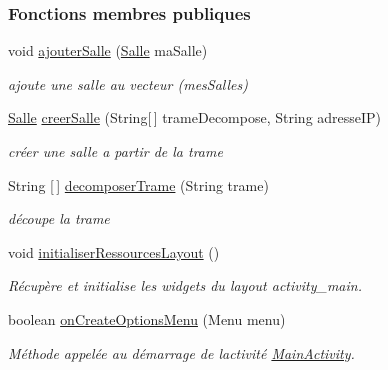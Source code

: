 \subsubsection*{Fonctions membres publiques}
\begin{DoxyCompactItemize}
\item 
void \hyperlink{classcom_1_1lasalle_1_1meeting_1_1_main_activity_a8fded0b03a19faea1b0e735af1aa52ca}{ajouter\+Salle} (\hyperlink{classcom_1_1lasalle_1_1meeting_1_1_salle}{Salle} ma\+Salle)
\begin{DoxyCompactList}\small\item\em ajoute une salle au vecteur (mes\+Salles) \end{DoxyCompactList}\item 
\hyperlink{classcom_1_1lasalle_1_1meeting_1_1_salle}{Salle} \hyperlink{classcom_1_1lasalle_1_1meeting_1_1_main_activity_a882bcd3e88633b5190d60625bb70dd43}{creer\+Salle} (String\mbox{[}$\,$\mbox{]} trame\+Decompose, String adresse\+IP)
\begin{DoxyCompactList}\small\item\em créer une salle a partir de la trame \end{DoxyCompactList}\item 
String \mbox{[}$\,$\mbox{]} \hyperlink{classcom_1_1lasalle_1_1meeting_1_1_main_activity_ab9a644c245dafa25dc2ef9d099565425}{decomposer\+Trame} (String trame)
\begin{DoxyCompactList}\small\item\em découpe la trame \end{DoxyCompactList}\item 
void \hyperlink{classcom_1_1lasalle_1_1meeting_1_1_main_activity_a2622b1b85884f9d66038adfc162b2c30}{initialiser\+Ressources\+Layout} ()
\begin{DoxyCompactList}\small\item\em Récupère et initialise les widgets du layout activity\+\_\+main. \end{DoxyCompactList}\item 
boolean \hyperlink{classcom_1_1lasalle_1_1meeting_1_1_main_activity_a2ea2affb4c84cb17d1bef20c47421d15}{on\+Create\+Options\+Menu} (Menu menu)
\begin{DoxyCompactList}\small\item\em Méthode appelée au démarrage de l\textquotesingle{}activité \hyperlink{classcom_1_1lasalle_1_1meeting_1_1_main_activity}{Main\+Activity}. \end{DoxyCompactList}\item 

\end{DoxyCompactItemize}
